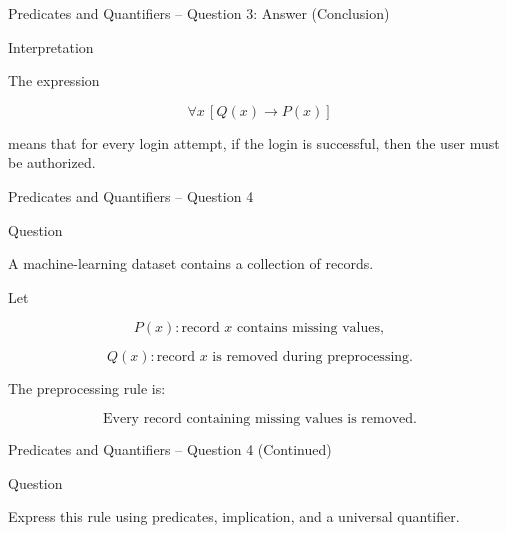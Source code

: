 \begin{frame}{Predicates and Quantifiers -- Question 3: Answer (Conclusion)}

\begin{exampleblock}{Interpretation}

The expression

$$
\forall x\,[Q(x)\rightarrow P(x)]
$$

means that for every login attempt, if the login is successful, then
the user must be authorized.

\end{exampleblock}

\end{frame}


\begin{frame}{Predicates and Quantifiers -- Question 4}

\begin{block}{Question}

A machine-learning dataset contains a collection of records.

Let

$$
P(x):\text{record $x$ contains missing values},
$$

$$
Q(x):\text{record $x$ is removed during preprocessing}.
$$

The preprocessing rule is:

$$
\text{Every record containing missing values is removed.}
$$

\end{block}

\end{frame}

\begin{frame}{Predicates and Quantifiers -- Question 4 (Continued)}

\begin{block}{Question}

Express this rule using predicates, implication, and a universal
quantifier.

\end{block}

\end{frame}


